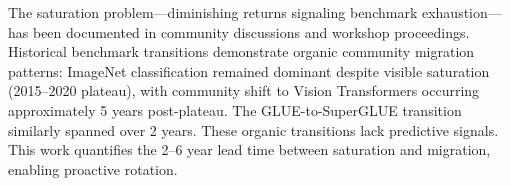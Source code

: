 
The saturation problem---diminishing returns signaling benchmark exhaustion---has been documented in community discussions and workshop proceedings. Historical benchmark transitions demonstrate organic community migration patterns: ImageNet classification remained dominant despite visible saturation (2015--2020 plateau), with community shift to Vision Transformers occurring approximately 5 years post-plateau. The GLUE-to-SuperGLUE transition similarly spanned over 2 years. These organic transitions lack predictive signals. This work quantifies the 2--6 year lead time between saturation and migration, enabling proactive rotation.

